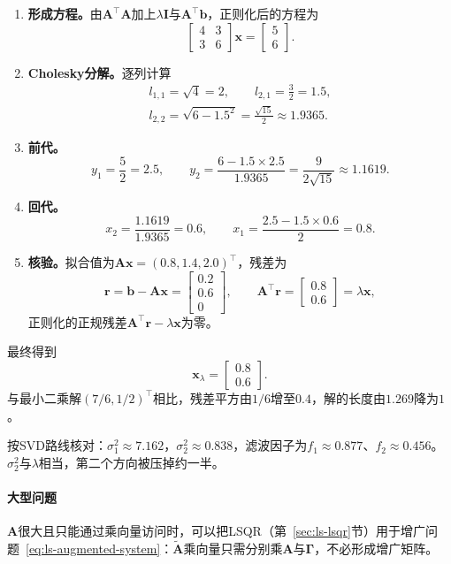 \begin{enumerate}
 \item \textbf{形成方程。}由$\bm A^\top\bm A$加上$\lambda\bm I$与$\bm A^\top\bm b$，正则化后的方程为
 \[
  \begin{bmatrix}4&3\\3&6\end{bmatrix}\bm x=\begin{bmatrix}5\\6\end{bmatrix}.
 \]

 \item \textbf{Cholesky分解。}逐列计算
 \[
  \begin{gathered}
  l_{1,1}=\sqrt4=2,\qquad l_{2,1}=\frac32=1.5,\\
  l_{2,2}=\sqrt{6-1.5^2}=\frac{\sqrt{15}}2\approx1.9365 .
  \end{gathered}
 \]

 \item \textbf{前代。}
 \[
  y_1=\frac52=2.5,\qquad
  y_2=\frac{6-1.5\times2.5}{1.9365}=\frac{9}{2\sqrt{15}}\approx1.1619 .
 \]

 \item \textbf{回代。}
 \[
  x_2=\frac{1.1619}{1.9365}=0.6,\qquad
  x_1=\frac{2.5-1.5\times0.6}{2}=0.8 .
 \]

 \item \textbf{核验。}拟合值为$\bm A\bm x=(0.8,1.4,2.0)^\top$，残差为
 \[
  \bm r=\bm b-\bm A\bm x=\begin{bmatrix}0.2\\0.6\\0\end{bmatrix},\qquad
  \bm A^\top\bm r=\begin{bmatrix}0.8\\0.6\end{bmatrix}=\lambda\bm x ,
 \]
 正则化的正规残差$\bm A^\top\bm r-\lambda\bm x$为零。
\end{enumerate}

最终得到
\[
 \bm x_\lambda=\begin{bmatrix}0.8\\0.6\end{bmatrix}.
\]
与最小二乘解$(7/6,1/2)^\top$相比，残差平方由$1/6$增至$0.4$，解的长度由$1.269$降为$1$。

按SVD路线核对：$\sigma_1^2\approx7.162$，$\sigma_2^2\approx0.838$，滤波因子为$f_1\approx0.877$、$f_2\approx0.456$。$\sigma_2^2$与$\lambda$相当，第二个方向被压掉约一半。

\paragraph{大型问题}
$\bm A$很大且只能通过乘向量访问时，可以把LSQR（第~\ref{sec:ls-lsqr}节）用于增广问题~\eqref{eq:ls-augmented-system}：$\tilde{\bm A}$乘向量只需分别乘$\bm A$与$\bm\Gamma$，不必形成增广矩阵。


